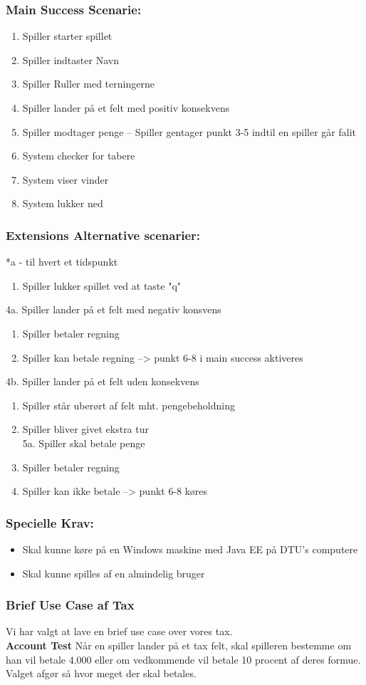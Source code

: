 \subsubsection*{Main Success Scenarie:}
\begin{enumerate}
\item Spiller starter spillet
\item Spiller indtaster Navn
\item Spiller Ruller med terningerne
\item Spiller lander på et felt med positiv konsekvens
\item Spiller modtager penge
-- Spiller gentager punkt 3-5 indtil en spiller går falit
\item System checker for tabere
\item System viser vinder
\item System lukker ned
\end{enumerate}
\subsubsection*{Extensions Alternative scenarier:}
*a - til hvert et tidspunkt
\begin{enumerate}
\item Spiller lukker spillet ved at taste "q"
\end{enumerate}
4a. Spiller lander på et felt med negativ konsvens
\begin{enumerate}
\item Spiller betaler regning
\item Spiller kan betale regning --> punkt 6-8 i main success aktiveres
\end{enumerate}
4b. Spiller lander på et felt uden konsekvens
\begin{enumerate}
\item Spiller står uberørt af felt mht. pengebeholdning
\item Spiller bliver givet ekstra tur
\\
5a. Spiller skal betale penge
\item  Spiller betaler regning
\item  Spiller kan ikke betale  --> punkt 6-8 køres
\end{enumerate}
\subsubsection*{Specielle Krav:}
\begin{itemize}
\item Skal kunne køre på en Windows maskine med Java EE på DTU's computere
\item Skal kunne spilles af en almindelig bruger
\end{itemize}
\subsubsection{Brief Use Case af Tax}
Vi har valgt at lave en brief use case over vores tax.
\\

\textbf{Account Test}
Når en spiller lander på et tax felt, skal spilleren bestemme om han vil betale 4.000 eller om vedkommende vil betale 10 procent af deres formue. Valget afgør så hvor meget der skal betales. 